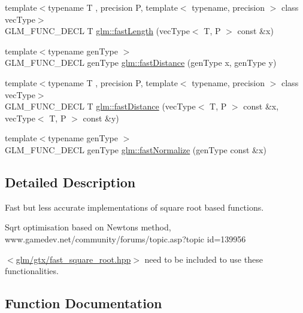\begin{DoxyCompactItemize}
{\footnotesize template$<$typename T , precision P, template$<$ typename, precision $>$ class vec\+Type$>$ }\\G\+L\+M\+\_\+\+F\+U\+N\+C\+\_\+\+D\+E\+C\+L T \hyperlink{group__gtx__fast__square__root_gae28a3099cbd6404a4ea8ef22147ed7b0}{glm\+::fast\+Length} (vec\+Type$<$ T, P $>$ const \&x)
\item 
{\footnotesize template$<$typename gen\+Type $>$ }\\G\+L\+M\+\_\+\+F\+U\+N\+C\+\_\+\+D\+E\+C\+L gen\+Type \hyperlink{group__gtx__fast__square__root_gaac333418d0c4e0cc6d3d219ed606c238}{glm\+::fast\+Distance} (gen\+Type x, gen\+Type y)
\item 
{\footnotesize template$<$typename T , precision P, template$<$ typename, precision $>$ class vec\+Type$>$ }\\G\+L\+M\+\_\+\+F\+U\+N\+C\+\_\+\+D\+E\+C\+L T \hyperlink{group__gtx__fast__square__root_ga6d1ac559cd77d69119e30c3aca0e14b5}{glm\+::fast\+Distance} (vec\+Type$<$ T, P $>$ const \&x, vec\+Type$<$ T, P $>$ const \&y)
\item 
{\footnotesize template$<$typename gen\+Type $>$ }\\G\+L\+M\+\_\+\+F\+U\+N\+C\+\_\+\+D\+E\+C\+L gen\+Type \hyperlink{group__gtx__fast__square__root_ga3b02c1d6e0c754144e2f1e110bf9f16c}{glm\+::fast\+Normalize} (gen\+Type const \&x)
\end{DoxyCompactItemize}


\subsection{Detailed Description}
Fast but less accurate implementations of square root based functions. 


\begin{DoxyItemize}
\item Sqrt optimisation based on Newton\textquotesingle{}s method, www.\+gamedev.\+net/community/forums/topic.asp?topic id=139956
\end{DoxyItemize}

$<$\hyperlink{fast__square__root_8hpp}{glm/gtx/fast\+\_\+square\+\_\+root.\+hpp}$>$ need to be included to use these functionalities. 

\subsection{Function Documentation}
\hypertarget{group__gtx__fast__square__root_gaac333418d0c4e0cc6d3d219ed606c238}{}
